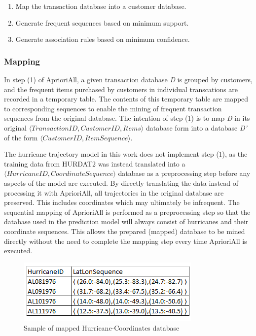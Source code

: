 \documentclass[12pt,conference]{IEEEtran}
\begin{document}
\begin{enumerate}
\item Map the transaction database into a customer database.
\item Generate frequent sequences based on minimum support.
\item Generate association rules based on minimum confidence.
\end{enumerate}

\subsubsection{Mapping}

In step (1) of AprioriAll, a given transaction database \textit{D} is grouped by customers, and the frequent items purchased by customers in individual transcations are recorded in a temporary table. The contents of this temporary table are mapped to corresponding sequences to enable the mining of frequent transaction sequences from the original database. The intention of step (1) is to map \textit{D} in its original $\langle TransactionID, CustomerID, Items\rangle$ database form into a database \textit{D'} of the form $\langle CustomerID, ItemSequence\rangle$. 

The hurricane trajectory model in this work does not implement step (1), as the training data from HURDAT2 was instead translated into a $\langle HurricaneID, CoordinateSequence\rangle$ database as a preprocessing step before any aspects of the model are executed. By directly translating the data instead of processing it with AprioriAll, all trajectories in the original database are preserved. This includes coordinates which may ultimately be infrequent. The sequential mapping of AprioriAll is performed as a preprocessing step so that the database used in the prediction model will always consist of hurricanes and their coordinate sequences. This allows the prepared (mapped) database to be mined directly without the need to complete the mapping step every time AprioriAll is executed.

\begin{figure}[h]
\caption{Sample of mapped Hurricane-Coordinates database}
\centering
\includegraphics[scale=1.0]{hurricane-table-sample}
\end{figure}
\end{document}
